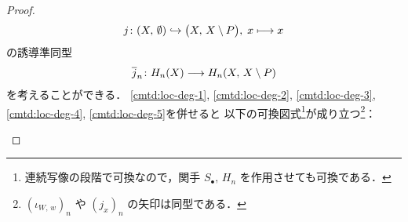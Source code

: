 \documentclass[algtopo_main]{subfiles}
\begin{document}
\begin{proof}
\begin{align}
        j \colon (X,\, \emptyset) \hookrightarrow \bigl(X,\, X \setminus P\bigr),\; x \longmapsto x
    \end{align}
    の誘導準同型
    \begin{align}
        \label{cmtd:loc-deg-5}
        \overline{j}_n \colon H_n(X) \longrightarrow H_n (X,\, X \setminus P)
    \end{align}
    を考えることができる．
    \eqref{cmtd:loc-deg-1}, \eqref{cmtd:loc-deg-2}, \eqref{cmtd:loc-deg-3}, \eqref{cmtd:loc-deg-4}, \eqref{cmtd:loc-deg-5}を併せると
    以下の可換図式\footnote{連続写像の段階で可換なので，関手 $S_\bullet,\, H_n$ を作用させても可換である．}が成り立つ\footnote{$(\iota_{W,\, w})_n$ や $(j_{x})_n$ の矢印は同型である．}：
    \begin{center}
    \end{center}
    

\end{proof}
\end{document}
